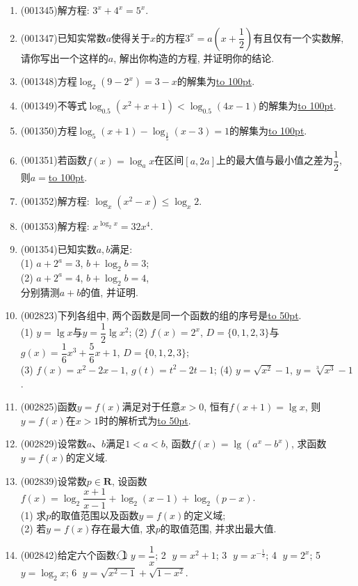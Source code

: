 \documentclass[10pt,a4paper]{article}
\newcommand{\blank}[1]{\underline{\hbox to #1pt{}}}
\begin{document}
\begin{enumerate}[1.]
\item {\tiny (001345)}解方程: $3^x+4^x=5^x$.
\item {\tiny (001347)}已知实常数$a$使得关于$x$的方程$3^x=a\left(x+\dfrac{1}{2}\right)$有且仅有一个实数解, 请你写出一个这样的$a$, 解出你构造的方程, 并证明你的结论.
\item {\tiny (001348)}方程$\log_2(9-2^x)=3-x$的解集为\blank{100}.
\item {\tiny (001349)}不等式$\log_{0.5}(x^2+x+1)<\log_{0.5}(4x-1)$的解集为\blank{100}.
\item {\tiny (001350)}方程$\log_5(x+1)-\log_{\frac{1}{5}}(x-3)=1$的解集为\blank{100}.
\item {\tiny (001351)}若函数$f(x)=\log_a x$在区间$[a,2a]$上的最大值与最小值之差为$\dfrac{1}{2}$, 则$a=$\blank{100}.
\item {\tiny (001352)}解方程: $\log_x(x^2-x)\le \log_x 2$.
\item {\tiny (001353)}解方程: $x^{\log_2 x}=32x^4$.
\item {\tiny (001354)}已知实数$a,b$满足: \\ 
(1) $a+2^a=3$, $b+\log_2 b=3$;\\ 
(2) $a+2^a=4$, $b+\log_2 b=4$, \\ 
分别猜测$a+b$的值, 并证明.
\item {\tiny (002823)}下列各组中, 两个函数是同一个函数的组的序号是\blank{50}.\\
(1) $y=\lg x$与$y=\dfrac 12\lg {x^2}$; (2) $f(x)=2^x$, $D=\{0,1,2,3\}$与$g(x)=\dfrac 16{x^3}+\dfrac 56x+1$, $D=\{0,1,2,3\}$; \\
(3) $f(x)=x^2-2x-1$, $g(t)=t^2-2t-1$; (4) $y=\sqrt{x^2}-1$, $y=\sqrt[3]{x^3}-1$.
\item {\tiny (002825)}函数$y=f(x)$满足对于任意$x>0$, 恒有$f(x+1)=\lg x$, 则$y=f(x)$在$x>1$时的解析式为\blank{50}.
\item {\tiny (002829)}设常数$a$、$b$满足$1<a<b$, 函数$f(x)=\lg(a^x-b^x)$, 求函数$y=f(x)$的定义域.
\item {\tiny (002839)}设常数$p\in \mathbf{R}$, 设函数$f(x)=\log_2\dfrac{x+1}{x-1}+\log_2(x-1)+\log_2(p-x)$.\\
(1) 求$p$的取值范围以及函数$y=f(x)$的定义域;\\
(2) 若$y=f(x)$存在最大值, 求$p$的取值范围, 并求出最大值.
\item {\tiny (002842)}给定六个函数: \textcircled{1} $y=\dfrac 1x$; \textcircled{2} $y=x^2+1$; \textcircled{3} $y={x^{-\frac 13}}$; \textcircled{4} $y=2^x$; \textcircled{5} $y=\log_2x$; \textcircled{6} $y=\sqrt{x^2-1}+\sqrt{1-x^2}$.\\

\end{enumerate}
\end{document}
